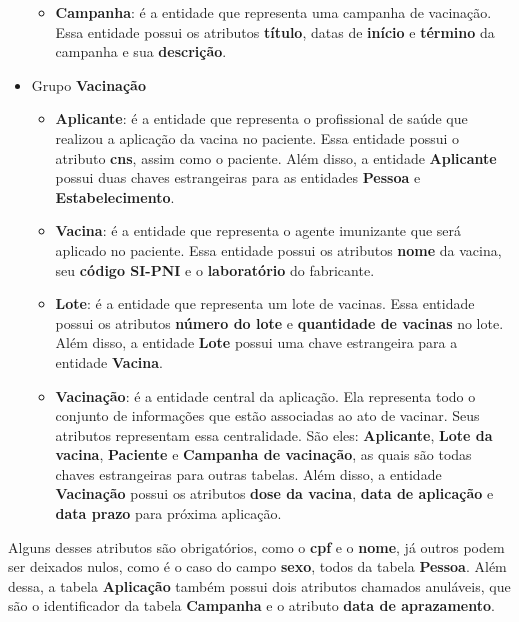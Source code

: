 \begin{itemize}
\begin{itemize}
    \item \textbf{Campanha}: é a entidade que representa uma campanha de vacinação. Essa entidade possui os atributos \textbf{título}, datas de \textbf{início} e \textbf{término} da campanha e sua \textbf{descrição}.
  \end{itemize}
  \item Grupo \textbf{Vacinação}
  \begin{itemize}
    \item \textbf{Aplicante}: é a entidade que representa o profissional de saúde que realizou a aplicação da vacina no paciente. Essa entidade possui o atributo \textbf{cns}, assim como o paciente. Além disso, a entidade \textbf{Aplicante} possui duas chaves estrangeiras para as entidades \textbf{Pessoa} e \textbf{Estabelecimento}.
    \item \textbf{Vacina}: é a entidade que representa o agente imunizante que será aplicado no paciente. Essa entidade possui os atributos \textbf{nome} da vacina, seu \textbf{código SI-PNI} e o \textbf{laboratório} do fabricante.
    \item \textbf{Lote}: é a entidade que representa um lote de vacinas. Essa entidade possui os atributos \textbf{número do lote} e \textbf{quantidade de vacinas} no lote. Além disso, a entidade \textbf{Lote} possui uma chave estrangeira para a entidade \textbf{Vacina}.
    \item \textbf{Vacinação}: é a entidade central da aplicação. Ela representa todo o conjunto de informações que estão associadas ao ato de vacinar. Seus atributos representam essa centralidade. São eles: \textbf{Aplicante}, \textbf{Lote da vacina}, \textbf{Paciente} e \textbf{Campanha de vacinação}, as quais são todas chaves estrangeiras para outras tabelas. Além disso, a entidade \textbf{Vacinação} possui os atributos \textbf{dose da vacina}, \textbf{data de aplicação} e \textbf{data prazo} para próxima aplicação.
  \end{itemize}
\end{itemize}

Alguns desses atributos são obrigatórios, como o \textbf{cpf} e o \textbf{nome}, já outros podem ser deixados nulos, como é o caso do campo \textbf{sexo}, todos da tabela \textbf{Pessoa}. Além dessa, a tabela \textbf{Aplicação} também possui dois atributos chamados anuláveis, que são o identificador da tabela \textbf{Campanha} e o atributo \textbf{data de aprazamento}.

